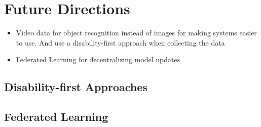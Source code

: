 

\section{Future Directions}\label{chap5:sec:future_directions}

\begin{itemize}
	\item Video data for object recognition instead of images for making systems easier to use. And use a disability-first approach when collecting the data
	\item Federated Learning for decentralizing model updates 
\end{itemize}


\subsection{Disability-first Approaches}


\subsection{Federated Learning}